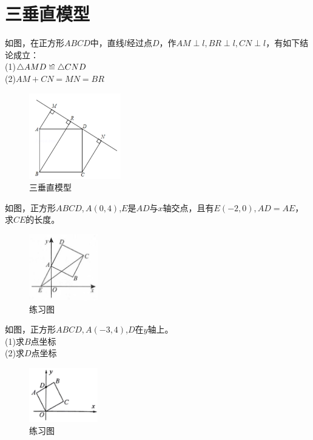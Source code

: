 \documentclass{ecnuthesis}
\newcommand\backcong{\mathrel{\reflectbox{$\cong$}}}
\begin{document}
\section{三垂直模型}
\begin{model}
    如图，在正方形$ABCD$中，直线$l$经过点$D$，作$AM\perp l,BR\perp l,CN\perp l$，有如下结论成立：\\
    (1)$\triangle AMD \backcong \triangle CND$ \\
    (2)$AM+CN=MN=BR$ \\
\end{model}
\begin{figure}[H]
\centering
\includegraphics[width=4cm]{picture/624.png}
\caption{三垂直模型}
\end{figure}
\begin{problem}
    如图，正方形$ABCD,A(0,4)$,$E$是$AD$与$x$轴交点，且有$E(-2,0),AD=AE$，求$CE$的长度。
\end{problem}
\begin{figure}[H]
\centering
\includegraphics[width=3cm]{picture/625.png}
\caption{练习图}
\end{figure}
\begin{problem}
    如图，正方形$ABCD,A(-3,4)$,$D$在$y$轴上。\\
    (1)求$B$点坐标 \\
    (2)求$D$点坐标 \\
\end{problem}
\begin{figure}[H]
\centering
\includegraphics[width=3cm]{picture/626.png}
\caption{练习图}
\end{figure}
\end{document}

